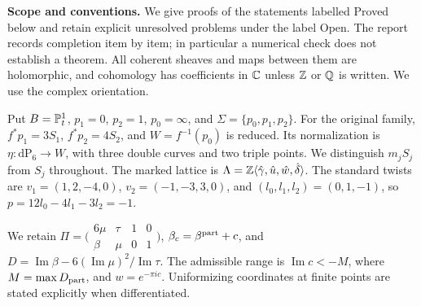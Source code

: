 \noindent\textbf{Scope and conventions.}
We give proofs of the statements labelled Proved below and retain explicit
unresolved problems under the label Open. The report records completion
item by item; in particular a numerical check does not establish a theorem.
All coherent sheaves and maps between them are holomorphic, and cohomology
has coefficients in $\mathbb C$ unless $\mathbb Z$ or $\mathbb Q$ is written.
We use the complex orientation.

Put $B=\mathbb P^1_t$, $p_1=0$, $p_2=1$, $p_0=\infty$, and
$\Sigma=\{p_0,p_1,p_2\}$. For the original family,
$f^*p_1=3S_1$, $f^*p_2=4S_2$, and $W=f^{-1}(p_0)$ is reduced.
Its normalization is $\eta:\mathrm{dP}_6\to W$, with three double curves
and two triple points. We distinguish $m_jS_j$ from $S_j$ throughout.
The marked lattice is $\Lambda=\mathbb Z\langle\hat\gamma,\hat u,\hat w,\hat\delta\rangle$.
The standard twists are $v_1=(1,2,-4,0)$, $v_2=(-1,-3,3,0)$,
and $(l_0,l_1,l_2)=(0,1,-1)$, so
$p=12l_0-4l_1-3l_2=-1$.

We retain $\Pi=\bigl(\begin{smallmatrix}6\mu&\tau&1&0\\
\beta&\mu&0&1\end{smallmatrix}\bigr)$,
$\beta_c=\beta^{\rm part}+c$, and
$D=\operatorname{Im}\beta-6(\operatorname{Im}\mu)^2/\operatorname{Im}\tau$.
The admissible range is $\operatorname{Im}c<-M$, where
$M=\max D_{\rm part}$, and $w=e^{-\pi i c}$.
Uniformizing coordinates at finite points are stated explicitly when differentiated.

